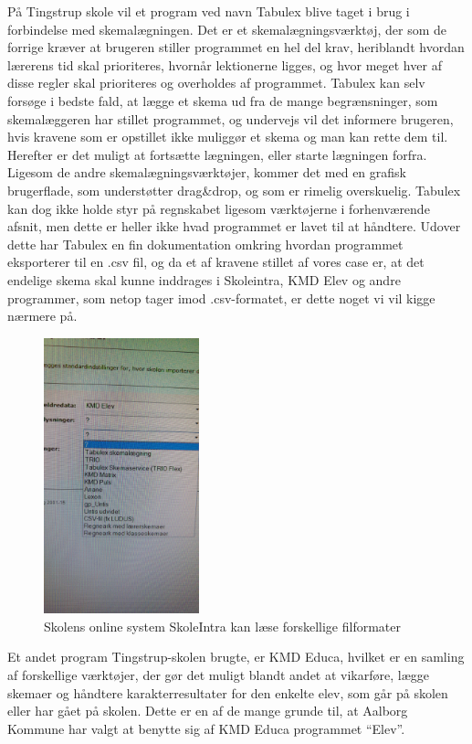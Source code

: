 På Tingstrup skole vil et program ved navn Tabulex blive taget i brug i forbindelse med skemalægningen. Det er et skemalægningsværktøj, der som de forrige kræver at brugeren stiller programmet en hel del krav, heriblandt hvordan lærerens tid skal prioriteres, hvornår lektionerne ligges, og hvor meget hver af disse regler skal prioriteres og overholdes af programmet\cite{Tabulex}. Tabulex kan selv forsøge i bedste fald, at lægge et skema ud fra de mange begrænsninger, som skemalæggeren har stillet programmet, og undervejs vil det informere brugeren, hvis kravene som er opstillet ikke muliggør et skema og man kan rette dem til. Herefter er det  muligt at fortsætte lægningen, eller starte lægningen forfra. Ligesom de andre skemalægningsværktøjer, kommer det med en grafisk brugerflade, som understøtter drag\&drop, og som er rimelig overskuelig. Tabulex kan dog ikke holde styr på regnskabet ligesom værktøjerne i forhenværende afsnit, men dette er heller ikke hvad programmet er lavet til at håndtere. Udover dette har Tabulex en fin dokumentation omkring hvordan programmet eksporterer til en .csv fil\cite{Tabulex_csv}, og da et af kravene stillet af vores case er, at det endelige skema skal kunne inddrages i Skoleintra, KMD Elev og andre programmer,\cite{interview_Kaerby} som netop tager imod .csv-formatet, er dette noget vi vil kigge nærmere på.
\begin{figure}[h!]
	\centering
	\includegraphics[width=0.4\textwidth]{../Billeder/Skemaimportering_filtyper_Intra.jpg}
	\caption{Skolens online system SkoleIntra kan læse forskellige filformater}
	\label{fig:kompatibleFiltyper}
\end{figure}
\FloatBarrier
Et andet program Tingstrup-skolen brugte, er KMD Educa, hvilket er en samling af forskellige værktøjer\cite{KMD}, der gør det muligt blandt andet at vikarføre, lægge skemaer og håndtere karakterresultater for den enkelte elev, som går på skolen eller har gået på skolen. Dette er en af de mange grunde til, at Aalborg Kommune har valgt at benytte sig af KMD Educa programmet ``Elev''\cite{useCase_KMD_Educa_Elev}.

